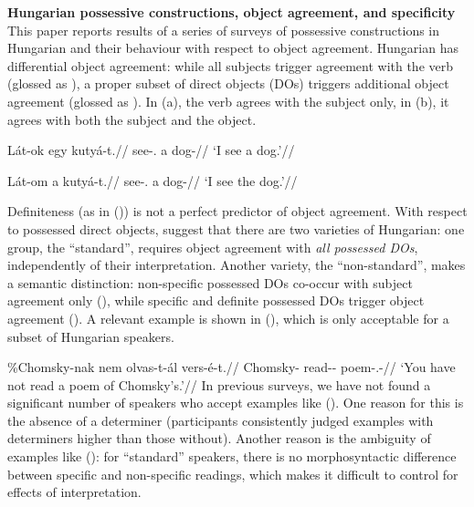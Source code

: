 \documentclass[fontsize=12pt]{scrartcl}
\begin{document}
\noindent\textsf{\textbf{Hungarian possessive constructions, object agreement,
        and specificity}}\\[-.33\baselineskip]

\noindent This paper reports results of a series of surveys of possessive
constructions in Hungarian and their behaviour with respect to object
agreement.  Hungarian has differential object agreement: while all subjects
trigger agreement with the verb (glossed as \Sbj{}), a proper subset of direct
objects (DOs) triggers additional object agreement (glossed as \Obj{}). In
(\nextx a), the verb agrees with the subject only, in (\nextx b), it agrees
with both the subject and the object.

\noindent\begin{minipage}[t]{.5\textwidth}
\pex
    \a
    \begingl
        \gla    Lát-ok egy kutyá-t.//
        \glb    see-\Fsg.\Sbj{} a dog-\Acc{}//
        \glft   `I see a dog.'//
    \endgl
\xe
\end{minipage}
\begin{minipage}[t]{.5\textwidth}
\pex[exno=, exnoformat=X]
    \a[label=b]
    \begingl
        \gla    Lát-om a kutyá-t.//
        \glb    see-\Fsg.\Obj{} a dog-\Acc{}//
        \glft   `I see the dog.'//
    \endgl
\xe
\end{minipage}

\noindent Definiteness (as in (\lastx)) is not a perfect predictor of object
agreement. With respect to possessed direct objects,
\textcite{Szabolcsi1994,EKiss2000} suggest that there are two varieties of
Hungarian: one group, the \enquote{standard}, requires object agreement with
\emph{all possessed DOs}, independently of their interpretation. Another
variety, the \enquote{non-standard}, makes a semantic distinction: non-specific
possessed DOs co-occur with subject agreement only (\Sbj), while specific and
definite possessed DOs trigger object agreement (\Obj). A relevant example is
shown in (\nextx), which is only acceptable for a subset of Hungarian speakers.

\ex
    \begingl{}
        \gla    \ljudge\%Chomsky-nak nem olvas-t-ál vers-é-t.//
        \glb    Chomsky-\Dat{} \Neg{} read-\Pst-\Ssg{} poem-\Poss.\Tsg-\Acc{}//
        \glft   `You have not read a poem of Chomsky's.'//
    \endgl
\xe
In previous surveys, we have not found a significant number of speakers who
accept examples like (\lastx). One reason for this is the absence of a
determiner (participants consistently judged examples with determiners higher
than those without). Another reason is the ambiguity of examples like (\lastx):
for \enquote{standard} speakers, there is no morphosyntactic difference between
specific and non-specific readings, which makes it difficult to control for
effects of interpretation.
\end{document}
